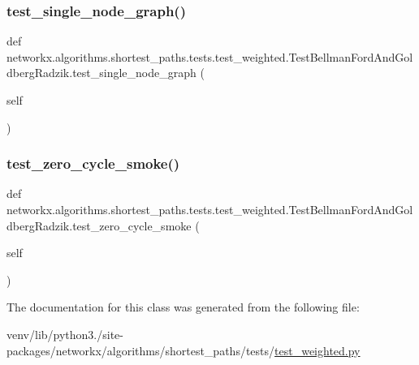 \subsubsection{\texorpdfstring{test\+\_\+single\+\_\+node\+\_\+graph()}{test\_single\_node\_graph()}}
{\footnotesize\ttfamily def networkx.\+algorithms.\+shortest\+\_\+paths.\+tests.\+test\+\_\+weighted.\+Test\+Bellman\+Ford\+And\+Goldberg\+Radzik.\+test\+\_\+single\+\_\+node\+\_\+graph (\begin{DoxyParamCaption}\item[{}]{self }\end{DoxyParamCaption})}

\mbox{\label{classnetworkx_1_1algorithms_1_1shortest__paths_1_1tests_1_1test__weighted_1_1TestBellmanFordAndGoldbergRadzik_a567234b75b82b64777159b174a7c4701}} 
\subsubsection{\texorpdfstring{test\+\_\+zero\+\_\+cycle\+\_\+smoke()}{test\_zero\_cycle\_smoke()}}
{\footnotesize\ttfamily def networkx.\+algorithms.\+shortest\+\_\+paths.\+tests.\+test\+\_\+weighted.\+Test\+Bellman\+Ford\+And\+Goldberg\+Radzik.\+test\+\_\+zero\+\_\+cycle\+\_\+smoke (\begin{DoxyParamCaption}\item[{}]{self }\end{DoxyParamCaption})}



The documentation for this class was generated from the following file\+:\begin{DoxyCompactItemize}
\item 
venv/lib/python3./site-\/packages/networkx/algorithms/shortest\+\_\+paths/tests/\hyperlink{test__weighted_8py}{test\+\_\+weighted.\+py}\end{DoxyCompactItemize}

